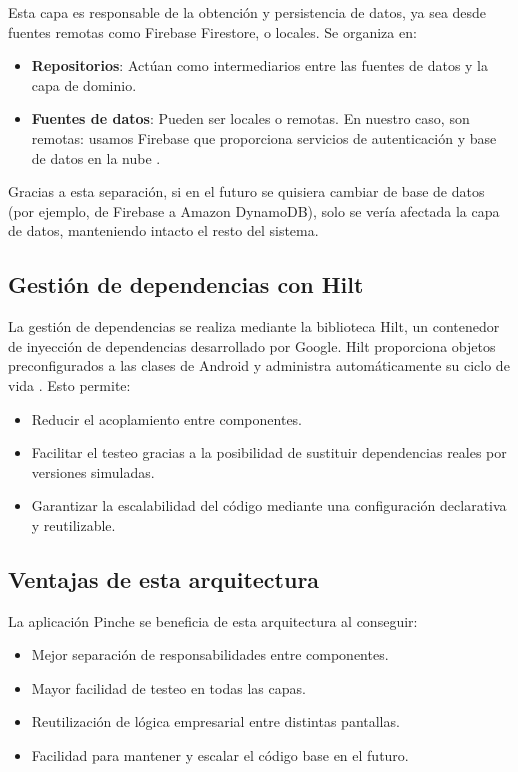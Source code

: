 Esta capa es responsable de la obtención y persistencia de datos, ya sea desde fuentes remotas como Firebase Firestore, o locales. Se organiza en:

\begin{itemize}
    \item \textbf{Repositorios}: Actúan como intermediarios entre las fuentes de datos y la capa de dominio.
    \item \textbf{Fuentes de datos}: Pueden ser locales o remotas. En nuestro caso, son remotas: usamos Firebase que proporciona servicios de autenticación y base de datos en la nube \cite{firestore, firebase-auth}.
\end{itemize}

Gracias a esta separación, si en el futuro se quisiera cambiar de base de datos (por ejemplo, de Firebase a Amazon DynamoDB), solo se vería afectada la capa de datos, manteniendo intacto el resto del sistema.

\subsection{Gestión de dependencias con Hilt}

La gestión de dependencias se realiza mediante la biblioteca Hilt, un contenedor de inyección de dependencias desarrollado por Google. Hilt proporciona objetos preconfigurados a las clases de Android y administra automáticamente su ciclo de vida \cite{hilt-android}. Esto permite:

\begin{itemize}
    \item Reducir el acoplamiento entre componentes.
    \item Facilitar el testeo gracias a la posibilidad de sustituir dependencias reales por versiones simuladas.
    \item Garantizar la escalabilidad del código mediante una configuración declarativa y reutilizable.
\end{itemize}

\subsection{Ventajas de esta arquitectura}

La aplicación Pinche se beneficia de esta arquitectura al conseguir:

\begin{itemize}
    \item Mejor separación de responsabilidades entre componentes.
    \item Mayor facilidad de testeo en todas las capas.
    \item Reutilización de lógica empresarial entre distintas pantallas.
    \item Facilidad para mantener y escalar el código base en el futuro.
\end{itemize}

